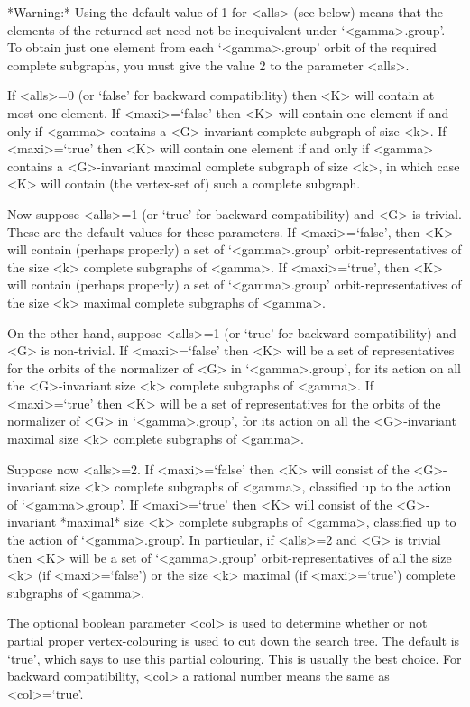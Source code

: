 *Warning:* Using the default value of 1 for <alls> (see below) means
that the elements of the returned set need not be inequivalent under
`<gamma>.group'. To obtain just one element from each `<gamma>.group'
orbit of the required complete subgraphs, you must give the value 2 to
the parameter <alls>.

If <alls>=0 (or `false' for backward compatibility) then <K> will contain
at most one element.  If <maxi>=`false' then <K> will contain one element
if and only if <gamma> contains a <G>-invariant complete subgraph of
size <k>.  If <maxi>=`true' then <K> will contain one element if and
only if <gamma> contains a <G>-invariant maximal complete subgraph
of size <k>, in which case <K> will contain (the vertex-set of) such
a complete subgraph.  

Now suppose <alls>=1 (or `true' for backward compatibility) and <G>
is trivial.  These are the default values for these parameters.
If <maxi>=`false', then <K> will contain (perhaps properly) a set of
`<gamma>.group' orbit-representatives of the size <k> complete subgraphs
of <gamma>.  If <maxi>=`true', then <K> will contain (perhaps properly)
a set of `<gamma>.group' orbit-representatives of the size <k> maximal
complete subgraphs of <gamma>.

On the other hand, suppose <alls>=1 (or `true' for backward
compatibility) and <G> is non-trivial. If <maxi>=`false' then <K> will
be a set of representatives for the orbits of the normalizer of <G>
in `<gamma>.group', for its action on all the <G>-invariant size <k>
complete subgraphs of <gamma>.  If <maxi>=`true' then <K> will be
a set of representatives for the orbits of the normalizer of <G> in
`<gamma>.group', for its action on all the <G>-invariant maximal size
<k> complete subgraphs of <gamma>.

Suppose now <alls>=2. If <maxi>=`false' then <K> will consist of the
<G>-invariant size <k> complete subgraphs of <gamma>, classified up to
the action of `<gamma>.group'.  If <maxi>=`true' then <K> will consist
of the <G>-invariant *maximal* size <k> complete subgraphs of <gamma>,
classified up to the action of `<gamma>.group'.  In particular, if
<alls>=2 and <G> is trivial then <K> will be a set of `<gamma>.group'
orbit-representatives of all the size <k> (if <maxi>=`false') or the
size <k> maximal (if <maxi>=`true') complete subgraphs of <gamma>.

The optional boolean parameter <col> is used to determine whether or not
partial proper vertex-colouring is used to cut down the search tree. The
default is `true', which says to use this partial colouring. This is
usually the best choice. For backward compatibility, <col> a rational
number means the same as <col>=`true'.

